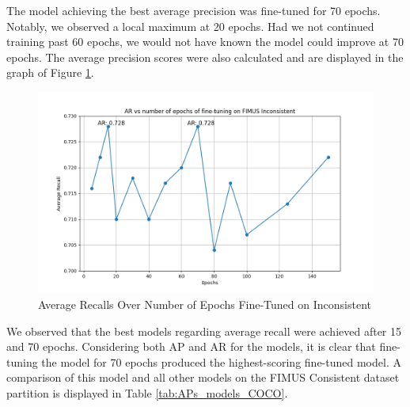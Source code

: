 The model achieving the best average precision was fine-tuned for 70 epochs. Notably, we observed a local maximum at 20 epochs. Had we not continued training past 60 epochs, we would not have known the model could improve at 70 epochs. The average precision scores were also calculated and are displayed in the graph of Figure \ref{fig:plot_AR}.

\begin{figure}[H]
    \centering
    \includegraphics[width=\textwidth]{Images/Analytics/plot_AR.png}
    \caption{Average Recalls Over Number of Epochs Fine-Tuned on Inconsistent}
    \label{fig:plot_AR}
\end{figure}

We observed that the best models regarding average recall were achieved after 15 and 70 epochs. Considering both AP and AR for the models, it is clear that fine-tuning the model for 70 epochs produced the highest-scoring fine-tuned model. A comparison of this model and all other models on the FIMUS Consistent dataset partition is displayed in Table \ref{tab:APs_models_COCO}.

